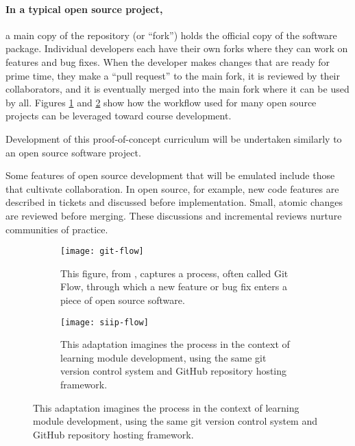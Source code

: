 \documentclass[11pt]{article}
\begin{document}
          \paragraph{In a typical open source project,} a main copy of the 
          repository (or ``fork'') holds the 
          official copy of the software package. Individual developers each have their own 
          forks where they can work on features and 
          bug fixes. When the developer makes changes that are ready for prime 
          time, they make a ``pull request'' to the main fork, it is 
          reviewed by their collaborators, and it is eventually merged into the 
          main fork where it can be used by all. Figures 
          \ref{fig:sub1} and \ref{fig:sub2} show how the workflow used for many 
          open source projects can be leveraged toward course development.

          Development of this proof-of-concept curriculum will be undertaken 
          similarly to an open source software project. 
          
          Some features of open source development that will be emulated 
          include those that cultivate collaboration. In open source, 
          for example, new code features are described in tickets and discussed 
          before implementation. Small, atomic changes are reviewed before 
          merging. These discussions and incremental reviews nurture 
          communities of practice.

          \begin{figure}
                  \centering
                  \begin{subfigure}{.4\textwidth}
                            \centering
                              \texttt{[image: git-flow]}
        \caption{This figure, from \cite{scopatz_effective_2015}, captures a 
                          process, often called Git Flow, through which a new 
                          feature or bug fix enters a piece of open source 
                          software.}
                                  \label{fig:sub1}
                  \end{subfigure}\hfill%
                  \begin{subfigure}{.4\textwidth}
                            \centering
                              \texttt{[image: siip-flow]}
  \caption{This adaptation imagines the process in the context of learning module development, using the same git version control system and GitHub repository hosting framework.}
                                  \label{fig:sub2}
                  \end{subfigure}
                  \label{fig:test}
          \end{figure}
          \FloatBarrier
\end{document}
